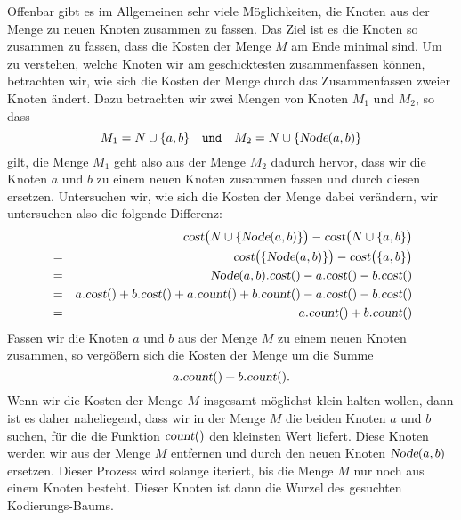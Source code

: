 Offenbar gibt es im Allgemeinen sehr viele M\"oglichkeiten, die Knoten aus der Menge zu
neuen Knoten zusammen zu fassen.  Das Ziel ist es die Knoten so zusammen zu fassen, dass
die Kosten der Menge $M$ am Ende  minimal sind.
Um zu verstehen, welche Knoten wir am geschicktesten zusammenfassen k\"onnen, betrachten wir, wie
sich die Kosten der Menge durch das Zusammenfassen zweier Knoten \"andert.
Dazu betrachten wir zwei Mengen von Knoten $M_1$ und $M_2$, so dass 
\[ M_1 = N \cup \{ a, b\} \quad \mathtt{und} \quad M_2 = N \cup \{ \textsl{Node}(a,b) \} \]
gilt, die Menge $M_1$ geht also aus der Menge $M_2$ dadurch hervor, dass wir
die Knoten $a$ und $b$ zu einem neuen Knoten zusammen fassen und durch diesen ersetzen.
Untersuchen wir, wie
sich die Kosten der Menge dabei ver\"andern, wir untersuchen also die folgende Differenz:
\begin{eqnarray*}
& & \textsl{cost}\bigl(N \cup \{ \textsl{Node}(a,b) \}\bigr) - \textsl{cost}\bigl(N \cup \{ a,b \}\bigr) \\
&=& \textsl{cost}\bigl( \{ \textsl{Node}(a,b) \}\bigr) - \textsl{cost}\bigl(\{ a,b \}\bigr)              \\
&=& \textsl{Node}(a,b).\textsl{cost}() - a.\textsl{cost}() - b.\textsl{cost}()                           \\
&=&   a.\textsl{cost}() + b.\textsl{cost}() + a.\textsl{count}() + b.\textsl{count}() 
    - a.\textsl{cost}() - b.\textsl{cost}()                                                              \\
&=& a.\textsl{count}() + b.\textsl{count}() 
\end{eqnarray*}
Fassen wir die Knoten $a$ und $b$ aus der Menge $M$ zu einem neuen Knoten zusammen, so verg\"o{\ss}ern sich
die Kosten der Menge um die Summe
\[ a.\textsl{count}() + b.\textsl{count}(). \]
Wenn wir die Kosten der Menge $M$ insgesamt m\"oglichst klein halten wollen, dann ist es daher naheliegend,
dass wir in der Menge $M$ die beiden Knoten $a$ und $b$ suchen, f\"ur die die Funktion
$\textsl{count}()$ den kleinsten Wert liefert.  Diese Knoten werden wir aus der Menge $M$
entfernen und durch den neuen Knoten $\textsl{Node}(a,b)$ ersetzen.
Dieser Prozess wird solange iteriert, bis die Menge $M$ nur noch aus einem Knoten besteht.  Dieser
Knoten ist dann die Wurzel des gesuchten Kodierungs-Baums. 

